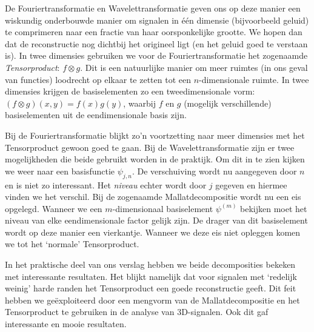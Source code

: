 De Fouriertransformatie en Wavelettransformatie geven ons op deze manier een wiskundig onderbouwde manier om signalen in \'e\'en dimensie (bijvoorbeeld geluid) te comprimeren naar een fractie van haar oorsponkelijke grootte. We hopen dan dat de reconstructie nog dichtbij het origineel ligt (en het geluid goed te verstaan is). In twee dimensies gebruiken we voor de Fouriertransformatie het zogenaamde \emph{Tensorproduct}: $f \otimes g$. Dit is een natuurlijke manier om meer ruimtes (in ons geval van functies) loodrecht op elkaar te zetten tot een $n$-dimensionale ruimte. In twee dimensies krijgen de basiselementen zo een tweedimensionale vorm: $(f \otimes g)(x,y) = f(x)g(y)$, waarbij $f$ en $g$ (mogelijk verschillende) basiselementen uit de eendimensionale basis zijn.

Bij de Fouriertransformatie blijkt zo'n voortzetting naar meer dimensies met het Tensorproduct gewoon goed te gaan. Bij de Wavelettransformatie zijn er twee mogelijkheden die beide gebruikt worden in de praktijk. Om dit in te zien kijken we weer naar een basisfunctie $\psi_{j,n}$. De verschuiving wordt nu aangegeven door $n$ en is niet zo interessant. Het \emph{niveau} echter wordt door $j$ gegeven en hiermee vinden we het verschil. Bij de zogenaamde Mallatdecompositie wordt nu een eis opgelegd. Wanneer we een $m$-dimensionaal basiselement $\psi^{(m)}$ bekijken moet het niveau van elke eendimensionale factor gelijk zijn. De drager van dit basiselement wordt op deze manier een vierkantje. Wanneer we deze eis niet opleggen komen we tot het `normale' Tensorproduct.

In het praktische deel van ons verslag hebben we beide decomposities bekeken met interessante resultaten. Het blijkt namelijk dat voor signalen met `redelijk weinig' harde randen het Tensorproduct een goede reconstructie geeft. Dit feit hebben we ge\"exploiteerd door een mengvorm van de Mallatdecompositie en het Tensorproduct te gebruiken in de analyse van 3D-signalen. Ook dit gaf interessante en mooie resultaten.

